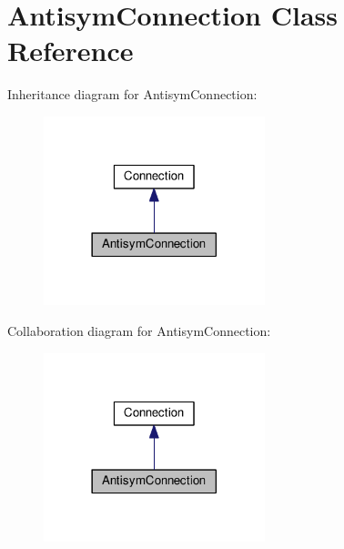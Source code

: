 \hypertarget{classAntisymConnection}{}\section{Antisym\+Connection Class Reference}
\label{classAntisymConnection}


Inheritance diagram for Antisym\+Connection\+:
\nopagebreak
\begin{figure}[H]
\begin{center}
\leavevmode
\includegraphics[width=182pt]{classAntisymConnection__inherit__graph}
\end{center}
\end{figure}


Collaboration diagram for Antisym\+Connection\+:
\nopagebreak
\begin{figure}[H]
\begin{center}
\leavevmode
\includegraphics[width=182pt]{classAntisymConnection__coll__graph}
\end{center}
\end{figure}
